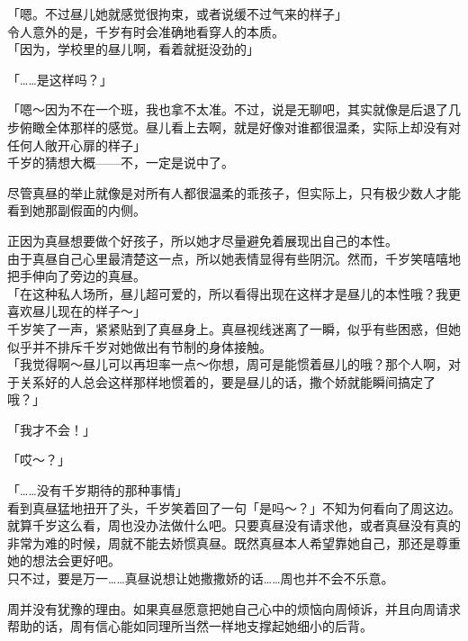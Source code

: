 「嗯。不过昼儿她就感觉很拘束，或者说缓不过气来的样子」\\%

令人意外的是，千岁有时会准确地看穿人的本质。\\

「因为，学校里的昼儿啊，看着就挺没劲的」

「……是这样吗？」

「嗯～因为不在一个班，我也拿不太准。不过，说是无聊吧，其实就像是后退了几步俯瞰全体那样的感觉。昼儿看上去啊，就是好像对谁都很温柔，实际上却没有对任何人敞开心扉的样子」\\

千岁的猜想大概——不，一定是说中了。

尽管真昼的举止就像是对所有人都很温柔的乖孩子，但实际上，只有极少数人才能看到她那副假面的内侧。

正因为真昼想要做个好孩子，所以她才尽量避免着展现出自己的本性。\\

由于真昼自己心里最清楚这一点，所以她表情显得有些阴沉。然而，千岁笑嘻嘻地把手伸向了旁边的真昼。\\

「在这种私人场所，昼儿超可爱的，所以看得出现在这样才是昼儿的本性哦？我更喜欢昼儿现在的样子～」\\

千岁笑了一声，紧紧贴到了真昼身上。真昼视线迷离了一瞬，似乎有些困惑，但她似乎并不排斥千岁对她做出有节制的身体接触。\\

「我觉得啊～昼儿可以再坦率一点～你想，周可是能惯着昼儿的哦？那个人啊，对于关系好的人总会这样那样地惯着的，要是昼儿的话，撒个娇就能瞬间搞定了哦？」

「我才不会！」

「哎～？」

「……没有千岁期待的那种事情」\\

看到真昼猛地扭开了头，千岁笑着回了一句「是吗～？」不知为何看向了周这边。\\

就算千岁这么看，周也没办法做什么吧。只要真昼没有请求他，或者真昼没有真的非常为难的时候，周就不能去娇惯真昼。既然真昼本人希望靠她自己，那还是尊重她的想法会更好吧。\\%

只不过，要是万一……真昼说想让她撒撒娇的话……周也并不会不乐意。

周并没有犹豫的理由。如果真昼愿意把她自己心中的烦恼向周倾诉，并且向周请求帮助的话，周有信心能如同理所当然一样地支撑起她细小的后背。\\

